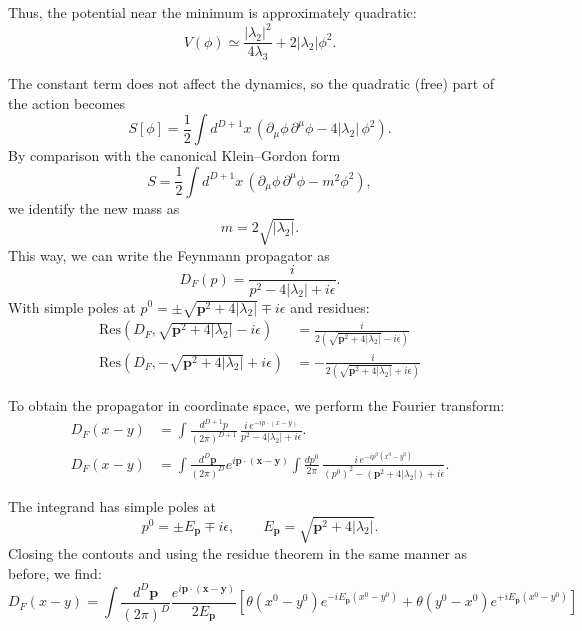 \documentclass[12pt]{article}
\newcommand{\+}{\dagger}
\begin{document}
Thus, the potential near the minimum is approximately quadratic:
\begin{equation}
    V(\phi) \simeq \frac{|\lambda_2|^2}{4\lambda_3} + 2|\lambda_2|\phi^2.
\end{equation}

The constant term does not affect the dynamics, so the quadratic (free) part of the action becomes
\begin{equation}
    S[\phi] = \frac{1}{2}\int d^{D+1}x\,\left( \partial_\mu\phi\,\partial^\mu\phi - 4|\lambda_2|\,\phi^2 \right).
\end{equation}
By comparison with the canonical Klein–Gordon form
\[
    S = \frac{1}{2}\int d^{D+1}x\,\left( \partial_\mu\phi\,\partial^\mu\phi - m^2\phi^2 \right),
\]
we identify the new mass as
\begin{equation}
    m = 2\sqrt{|\lambda_2|}.
\end{equation}
This way, we can write the Feynmann propagator as 
\begin{equation*}
    D_F(p) = \frac{i}{p^2 - 4|\lambda_2| + i\epsilon}.
\end{equation*}
With simple poles at $p^0 = \pm \sqrt{\mathbf{p}^2 + 4|\lambda_2|} \mp i\epsilon$ and residues:
\begin{align*}
    \text{Res}(D_F, \sqrt{\mathbf{p}^2 + 4|\lambda_2|} - i\epsilon) &= \frac{i}{2(\sqrt{\mathbf{p}^2 + 4|\lambda_2|} - i\epsilon)} \\
    \text{Res}(D_F, -\sqrt{\mathbf{p}^2 + 4|\lambda_2|} + i\epsilon) &= -\frac{i}{2(\sqrt{\mathbf{p}^2 + 4|\lambda_2|} + i\epsilon)}
\end{align*}

To obtain the propagator in coordinate space, we perform the Fourier transform:
\begin{align*}
    D_F(x - y) &= \int \frac{d^{D+1}p}{(2\pi)^{D+1}} \,
    \frac{i\,e^{-ip\cdot(x - y)}}{p^2 - 4|\lambda_2| + i\epsilon}. \\
    D_F(x - y) &=
    \int \frac{d^D\mathbf{p}}{(2\pi)^D} e^{i\mathbf{p}\cdot(\mathbf{x} - \mathbf{y})}
    \int \frac{dp^0}{2\pi} \,
    \frac{i\,e^{-ip^0(x^0 - y^0)}}{(p^0)^2 - (\mathbf{p}^2 + 4|\lambda_2|) + i\epsilon}.
\end{align*}

The integrand has simple poles at
\[
    p^0 = \pm E_{\mathbf{p}} \mp i\epsilon, \qquad
    E_{\mathbf{p}} = \sqrt{\mathbf{p}^2 + 4|\lambda_2|}.
\]
Closing the contouts and using the residue theorem in the same manner as before, we find:
\begin{equation}
    \boxed{D_F(x - y)
    = \int \frac{d^D\mathbf{p}}{(2\pi)^D}
    \frac{e^{i\mathbf{p}\cdot(\mathbf{x} - \mathbf{y})}}{2E_{\mathbf{p}}}
    \left[
        \theta(x^0 - y^0) e^{-iE_{\mathbf{p}}(x^0 - y^0)}
        + \theta(y^0 - x^0) e^{+iE_{\mathbf{p}}(x^0 - y^0)}
    \right]}
\end{equation}
\end{document}
